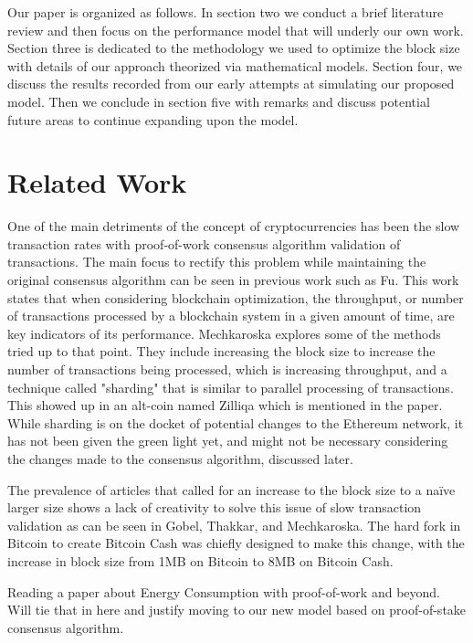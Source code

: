 \documentclass[conference]{IEEEtran}
\begin{document}
Our paper is organized as follows. In section two we conduct a brief literature review and 
then focus on the performance model that will underly our own work. Section three is 
dedicated to the methodology we used to optimize the block size with details of our 
approach theorized via mathematical models. Section four, we discuss the results recorded 
from our early attempts at simulating our proposed model. Then we conclude in section five 
with remarks and discuss potential future areas to continue expanding upon the model. 

\section{Related Work}\label{related}

One of the main detriments of the concept of cryptocurrencies has been the slow transaction
rates with proof-of-work consensus algorithm validation of transactions. The main focus to rectify 
this problem while maintaining the original consensus algorithm can be seen in previous work such 
as Fu\cite{2020_IEEEToVT_Fu}. This work states that when considering blockchain optimization, 
the throughput, or number of transactions processed by a blockchain system in a given amount of 
time, are key indicators of its performance. Mechkaroska\cite{2018_TELFOR_Mechkaroska} explores
some of the methods tried up to that point. They include increasing the block size to increase the 
number of transactions being processed, which is increasing throughput, and a technique called 
"sharding" that is similar to parallel processing of transactions. This showed up in an alt-coin named 
Zilliqa\cite{2017_Zilliqa_Zilliqa} which is mentioned in the paper. While sharding is on the docket of 
potential changes to the Ethereum network, it has not been given the green light yet, and might not
be necessary considering the changes made to the consensus algorithm, discussed later.

The prevalence of articles that called for an increase to the block size to a na\"ive larger size shows 
a lack of creativity to solve this issue of slow transaction validation as can be seen in Gobel, Thakkar, 
and Mechkaroska\cite{2017_IEEE_Gobel, 2018_IEEE_Thakkar, 2018_TELFOR_Mechkaroska}. The 
hard fork in Bitcoin to create Bitcoin Cash was chiefly designed to make this change, with the increase 
in block size from 1MB on Bitcoin to 8MB on Bitcoin Cash. 

Reading a paper about Energy Consumption with proof-of-work and beyond. Will tie that in here and justify
moving to our new model based on proof-of-stake consensus algorithm.
\end{document}
